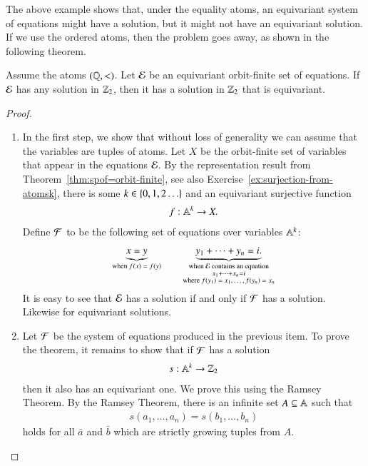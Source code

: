 The above example shows that, under the equality atoms, an equivariant system of equations might have a solution, but it might not have an equivariant solution. If we use the ordered atoms, then the problem goes away, as shown in the following theorem.

\begin{theorem}\label{thm:equivariant-solutions-to-systems-of-equations}
 Assume the atoms $(\mathbb Q, <)$. 
 Let ${\mathcal E}$ be an equivariant orbit-finite set of equations. If ${\mathcal E}$ has any solution in ${\mathbb Z}_2$, then it has a solution in ${\mathbb Z}_2$ that is equivariant. 
\end{theorem}
\begin{proof}\ 
 \begin{enumerate}
 \item In the first step, we show that without loss of generality we can assume that the variables are tuples of atoms. Let $X$ be the orbit-finite set of variables that appear in the equations ${\mathcal E}$. By the representation result from Theorem~\ref{thm:spof=orbit-finite}, see also Exercise~\ref{ex:surjection-from-atomsk}, there is some $k \in \{0,1,2\ldots\}$ and an equivariant surjective function 
 \begin{align*}
 f : \mathbb A^k \to X.
 \end{align*}
 Define ${\mathcal F}$ to be the following set of equations over variables $\mathbb A^k$:
 \begin{align*}
 \underbrace{x=y}_{\text{when $f(x)=f(y)$}} \qquad \underbrace{ y_1 + \cdots + y_n = i.}_{\substack{\text{when ${\mathcal E}$ contains an equation}\\ x_1 + \cdots + x_n = i \\ \text{where $f(y_1)=x_1,\ldots,f(y_n)=x_n$}}}
 \end{align*}
 It is easy to see that ${\mathcal E}$ has a solution if and only if ${\mathcal F}$ has a solution. Likewise for equivariant solutions. 
 \item Let ${\mathcal F}$ be the system of equations produced in the previous item. To prove the theorem, it remains to show that if ${\mathcal F}$ has a solution
 \begin{align*}
 s : \mathbb A^k \to {\mathbb Z}_2
 \end{align*}
 then it also has an equivariant one. We prove this using the Ramsey Theorem. By the Ramsey Theorem, there is an infinite set $A \subseteq \mathbb {\mathbb A}$ such that 
\begin{align*}
 s(a_1,\ldots,a_n) = s(b_1,\ldots,b_n) 
\end{align*}
holds for all $\bar a$ and $\bar b$ which are strictly growing tuples from $A$. 

\end{enumerate}
\end{proof}
